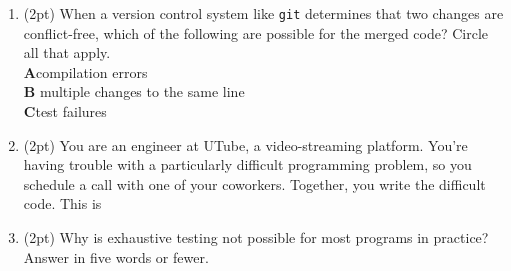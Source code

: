 \documentclass{report}
\newif\ifkey
\newcommand{\correct}[1]{\ifkey\color{red}\textbf{#1}\color{black}\else\textbf{#1}\fi\xspace}
\newcommand{\answershort}[1]{\ifkey\color{red}\underline{\textbf{#1}}\color{black}\else\underline{\hspace{3in}}\fi\xspace}
\newcommand*{\pts}[1]{\addtocounter{points}{#1}(#1pt)}
\begin{document}
\begin{spacing}{1.4}
\begin{enumerate}[leftmargin=*]


   \item \pts{2} When a version control system like \lstinline{git} determines that two changes are conflict-free, which of the following
     are possible for the merged code? Circle all that apply.
     \\ \correct{A}\hspace{0.2in}compilation errors
     \\ \textbf{B}\hspace{0.2in} multiple changes to the same line
     \\ \correct{C}\hspace{0.2in}test failures

   \item \pts{2} You are an engineer at UTube, a video-streaming platform. You're having trouble with a particularly difficult
     programming problem, so you schedule a call with one of your coworkers. Together, you write the difficult code. This is
     \answershort{pair programming}

   \item \pts{2} Why is exhaustive testing not possible for most programs in practice? Answer in five words or fewer.
     \answershort{Input space is too large.}


\end{enumerate}
\end{spacing}
\end{document}
